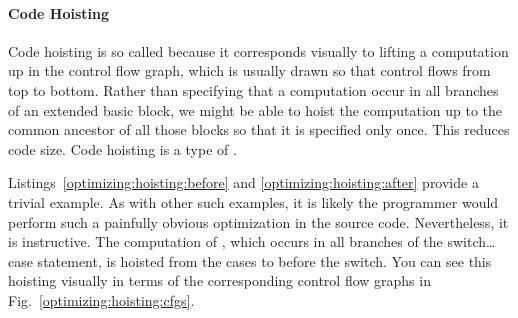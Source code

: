 



\paragraph{Code Hoisting}
Code hoisting is so called because it corresponds visually to lifting a computation up in the control flow graph, which is usually drawn so that control flows from top to bottom. Rather than specifying that a computation occur in all branches of an extended basic block, we might be able to hoist the computation up to the common ancestor of all those blocks so that it is specified only once. This reduces code size. Code hoisting is a type of .

Listings~\ref{optimizing:hoisting:before} and \ref{optimizing:hoisting:after} provide a trivial example. As with other such examples, it is likely the programmer would perform such a painfully obvious optimization in the source code. Nevertheless, it is instructive. The computation of , which occurs in all branches of the switch\dots{}case statement, is hoisted from the cases to before the switch. You can see this hoisting visually in terms of the corresponding control flow graphs in Fig.~\ref{optimizing:hoisting:cfgs}.








